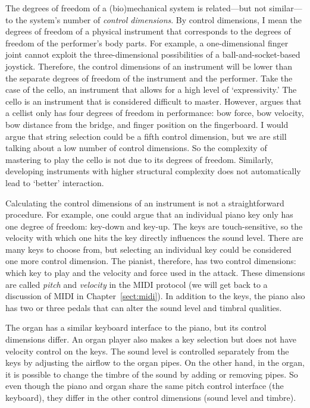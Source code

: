 The degrees of freedom of a (bio)mechanical system is related---but not similar---to the system's number of \emph{control dimensions}. By control dimensions, I mean the degrees of freedom of a physical instrument that corresponds to the degrees of freedom of the performer's body parts. For example, a one-dimensional finger joint cannot exploit the three-dimensional possibilities of a ball-and-socket-based joystick. Therefore, the control dimensions of an instrument will be lower than the separate degrees of freedom of the instrument and the performer. Take the case of the cello, an instrument that allows for a high level of `expressivity.' The cello is an instrument that is considered difficult to master. However, \citet{rowe_machine_2001} argues that a cellist only has four degrees of freedom in performance: bow force, bow velocity, bow distance from the bridge, and finger position on the fingerboard. I would argue that string selection could be a fifth control dimension, but we are still talking about a low number of control dimensions. So the complexity of mastering to play the cello is not due to its degrees of freedom. Similarly, developing instruments with higher structural complexity does not automatically lead to `better' interaction.

Calculating the control dimensions of an instrument is not a straightforward procedure. For example, one could argue that an individual piano key only has one degree of freedom: key-down and key-up. The keys are touch-sensitive, so the velocity with which one hits the key directly influences the sound level. There are many keys to choose from, but selecting an individual key could be considered one more control dimension. The pianist, therefore, has two control dimensions: which key to play and the velocity and force used in the attack. These dimensions are called \emph{pitch} and \emph{velocity} in the MIDI protocol (we will get back to a discussion of MIDI in Chapter~\ref{sect:midi}). In addition to the keys, the piano also has two or three pedals that can alter the sound level and timbral qualities.

The organ has a similar keyboard interface to the piano, but its control dimensions differ. An organ player also makes a key selection but does not have velocity control on the keys. The sound level is controlled separately from the keys by adjusting the airflow to the organ pipes. On the other hand, in the organ, it is possible to change the timbre of the sound by adding or removing pipes. So even though the piano and organ share the same pitch control interface (the keyboard), they differ in the other control dimensions (sound level and timbre).

